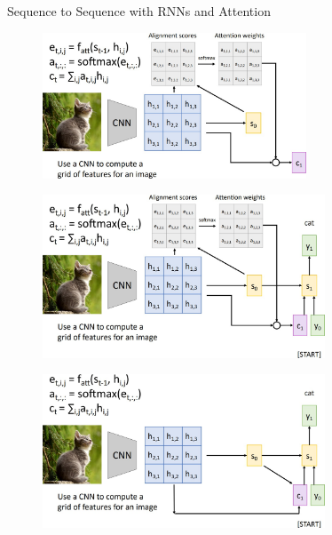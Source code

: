 \begin{frame}[allowframebreaks]{Sequence to Sequence with RNNs and Attention}
    \framebreak

    \begin{figure}
        \flushleft
        \includegraphics[width=0.7\textwidth,keepaspectratio]{images/rnn/slide_27_1_img.jpg}
    \end{figure}

    \framebreak

    \begin{figure}
        \flushleft
        \includegraphics[width=0.75\textwidth,keepaspectratio]{images/rnn/slide_28_1_img.jpg}
    \end{figure}

    \framebreak

    \begin{figure}
        \flushleft
        \includegraphics[width=0.75\textwidth,keepaspectratio]{images/rnn/slide_29_1_img.jpg}
    \end{figure}


\end{frame}
